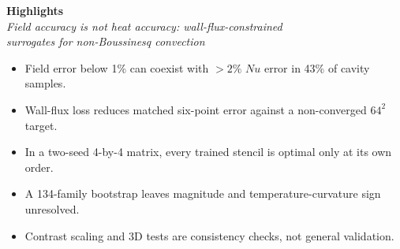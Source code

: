 \documentclass[11pt]{article}
\begin{document}
\begin{center}
{\large\bfseries Highlights}\\[2pt]
{\itshape Field accuracy is not heat accuracy: wall-flux-constrained}\\[2pt]
{\itshape surrogates for non-Boussinesq convection}
\end{center}
\begin{itemize}\setlength{\itemsep}{8pt}
\item Field error below 1\% can coexist with $>2\%$ $Nu$ error in 43\% of cavity samples.
\item Wall-flux loss reduces matched six-point error against a non-converged $64^2$ target.
\item In a two-seed 4-by-4 matrix, every trained stencil is optimal only at its own order.
\item A 134-family bootstrap leaves magnitude and temperature-curvature sign unresolved.
\item Contrast scaling and 3D tests are consistency checks, not general validation.
\end{itemize}
\end{document}
